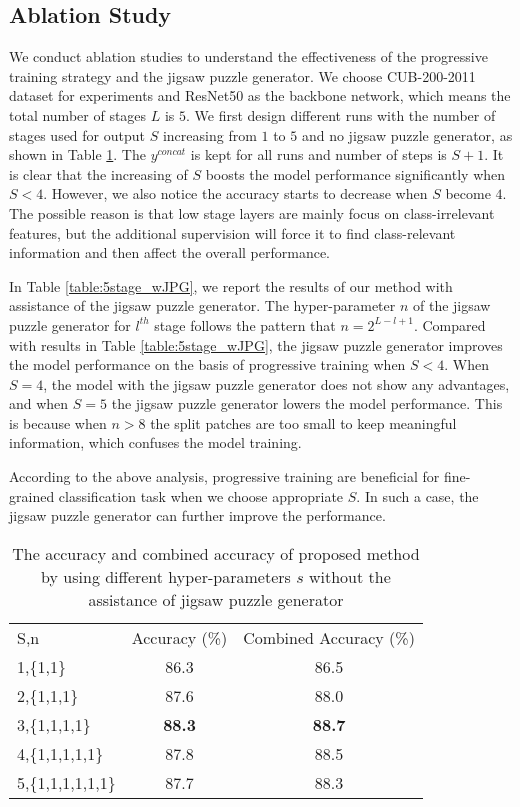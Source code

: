 \documentclass{llncs}
\begin{document}
\subsection{Ablation Study}\label{ssec:ablation}

We conduct ablation studies to understand the effectiveness of the progressive training strategy and the jigsaw puzzle generator. We choose CUB-200-2011 dataset for experiments and ResNet50 as the backbone network, which means the total number of stages $L$ is $5$. We first design different runs with the number of stages used for output $S$ increasing from $1$ to $5$ and no jigsaw puzzle generator, as shown in Table \ref{table:5stage_woJPG}. The ${y}^{concat}$ is kept for all runs and number of steps is $S+1$. It is clear that the increasing of $S$ boosts the model performance significantly when $S<4$. However, we also notice the accuracy starts to decrease when $S$ become $4$. The possible reason is that low stage layers are mainly focus on class-irrelevant features, but the additional supervision will force it to find class-relevant information and then affect the overall performance.

In Table \ref{table:5stage_wJPG}, we report the results of our method with assistance of the jigsaw puzzle generator. The hyper-parameter $n$ of the jigsaw puzzle generator for $l^{th}$ stage follows the pattern that $n=2^{L-l+1}$. Compared with results in Table \ref{table:5stage_wJPG}, the jigsaw puzzle generator improves the model performance on the basis of progressive training when $S<4$. When $S=4$, the model with the jigsaw puzzle generator does not show any advantages, and when $S=5$ the jigsaw puzzle generator lowers the model performance. This is because when $n>8$ the split patches are too small to keep meaningful information, which confuses the model training.

According to the above analysis, progressive training are beneficial for fine-grained classification task when we choose appropriate $S$. In such a case, the jigsaw puzzle generator can further improve the performance.

\setlength{\tabcolsep}{4pt}
\begin{table}[!t]
\begin{center}
\caption{The accuracy and combined accuracy of proposed method by using different hyper-parameters $s$ without the assistance of jigsaw puzzle generator}
\label{table:5stage_woJPG}
\begin{tabular}{lcc}
\hline\noalign{\smallskip}
S,n & Accuracy (\%) & Combined Accuracy (\%)\\
\noalign{\smallskip}
\hline
\noalign{\smallskip}
1,\{1,1\} & 86.3 & 86.5\\
2,\{1,1,1\} & 87.6 & 88.0\\
3,\{1,1,1,1\} & {\bf 88.3} & {\bf 88.7}\\
4,\{1,1,1,1,1\} & 87.8 & 88.5\\
5,\{1,1,1,1,1,1\} & 87.7 & 88.3\\
\hline
\end{tabular}
\end{center}
\end{table}
\setlength{\tabcolsep}{1.4pt}
\end{document}
